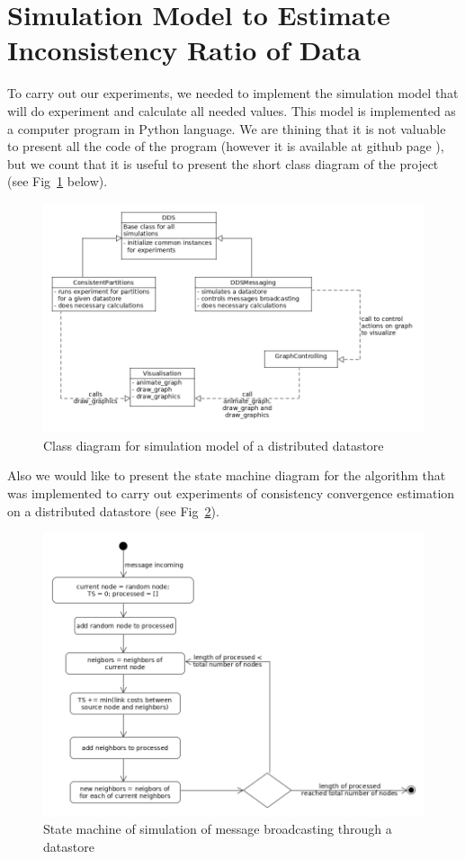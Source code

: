\documentclass[a4paper,14pt]{llncs}
\begin{document}
\section{Simulation Model to Estimate Inconsistency Ratio of Data}\label{sec:simulation}
To carry out our experiments, we needed to implement the simulation model that will do experiment and calculate all needed values. This model is implemented as a computer program in Python language. We are thining that it is not valuable to present all the code of the program (however it is available at github page \cite{bib:github_dds}), but we count that it is useful to present the short class diagram of the project (see Fig~\ref{pic:diagram} below).
\begin{figure}
\centering\includegraphics[scale=0.4]{images/dds-class-diagram.png}
\caption{Class diagram for simulation model of a distributed datastore}
\label{pic:diagram}
\end{figure}
%
Also we would like to present the state machine diagram for the algorithm that was implemented to carry out experiments of consistency convergence estimation on a distributed datastore (see Fig~\ref{pic:state-machine}).
\begin{figure}[t]
\centering\includegraphics[scale=0.4]{images/message-broadcasting-state-machine.png}
\caption{State machine of simulation of message broadcasting through a datastore}\label{pic:state-machine}
\end{figure}
\end{document}
